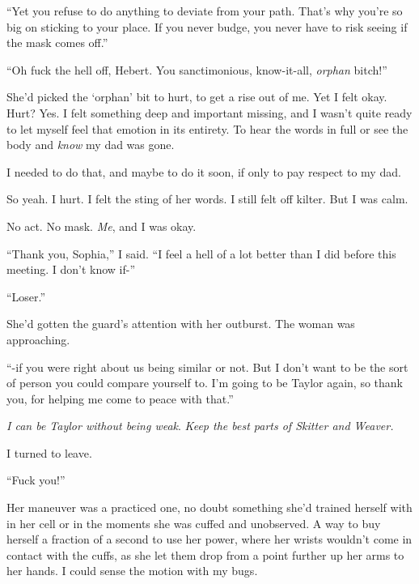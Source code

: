 ``Yet you refuse to do anything to deviate from your path.  That's why you're so big on sticking to your place.  If you never budge, you never have to risk seeing if the mask comes off.''



``Oh fuck the hell off, Hebert.  You sanctimonious, know-it-all, \emph{orphan} bitch!''



She'd picked the `orphan' bit to hurt, to get a rise out of me.  Yet I felt okay.  Hurt?  Yes.  I felt something deep and important missing, and I wasn't quite ready to let myself feel that emotion in its entirety.  To hear the words in full or see the body and \emph{know} my dad was gone.



I needed to do that, and maybe to do it soon, if only to pay respect to my dad.



So yeah.  I hurt.  I felt the sting of her words.  I still felt off kilter.  But I was calm.



No act.  No mask.  \emph{Me}, and I was okay.



``Thank you, Sophia,'' I said.  ``I feel a hell of a lot better than I did before this meeting.  I don't know if-''



``Loser.''



She'd gotten the guard's attention with her outburst.  The woman was approaching.



``-if you were right about us being similar or not.  But I don't want to be the sort of person you could compare yourself to.  I'm going to be Taylor again, so thank you, for helping me come to peace with that.''



\emph{I can be Taylor without being weak}.  \emph{Keep the best parts of Skitter and Weaver.}



I turned to leave.



``Fuck you!''



Her maneuver was a practiced one, no doubt something she'd trained herself with in her cell or in the moments she was cuffed and unobserved.  A way to buy herself a fraction of a second to use her power, where her wrists wouldn't come in contact with the cuffs, as she let them drop from a point further up her arms to her hands.  I could sense the motion with my bugs.



